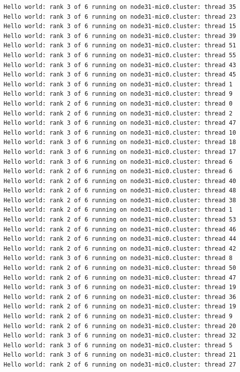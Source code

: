 \documentclass[pscyr,10pt]{hedlab}
\begin{document}
\begin{lstlisting}
  Hello world: rank 3 of 6 running on node31-mic0.cluster: thread 35
  Hello world: rank 3 of 6 running on node31-mic0.cluster: thread 23
  Hello world: rank 3 of 6 running on node31-mic0.cluster: thread 15
  Hello world: rank 3 of 6 running on node31-mic0.cluster: thread 39
  Hello world: rank 3 of 6 running on node31-mic0.cluster: thread 51
  Hello world: rank 3 of 6 running on node31-mic0.cluster: thread 55
  Hello world: rank 3 of 6 running on node31-mic0.cluster: thread 43
  Hello world: rank 3 of 6 running on node31-mic0.cluster: thread 45
  Hello world: rank 3 of 6 running on node31-mic0.cluster: thread 1
  Hello world: rank 3 of 6 running on node31-mic0.cluster: thread 9
  Hello world: rank 2 of 6 running on node31-mic0.cluster: thread 0
  Hello world: rank 2 of 6 running on node31-mic0.cluster: thread 2
  Hello world: rank 3 of 6 running on node31-mic0.cluster: thread 47
  Hello world: rank 3 of 6 running on node31-mic0.cluster: thread 10
  Hello world: rank 3 of 6 running on node31-mic0.cluster: thread 18
  Hello world: rank 3 of 6 running on node31-mic0.cluster: thread 17
  Hello world: rank 3 of 6 running on node31-mic0.cluster: thread 6
  Hello world: rank 2 of 6 running on node31-mic0.cluster: thread 6
  Hello world: rank 2 of 6 running on node31-mic0.cluster: thread 40
  Hello world: rank 2 of 6 running on node31-mic0.cluster: thread 48
  Hello world: rank 2 of 6 running on node31-mic0.cluster: thread 38
  Hello world: rank 2 of 6 running on node31-mic0.cluster: thread 1
  Hello world: rank 2 of 6 running on node31-mic0.cluster: thread 53
  Hello world: rank 2 of 6 running on node31-mic0.cluster: thread 46
  Hello world: rank 2 of 6 running on node31-mic0.cluster: thread 44
  Hello world: rank 2 of 6 running on node31-mic0.cluster: thread 42
  Hello world: rank 3 of 6 running on node31-mic0.cluster: thread 8
  Hello world: rank 2 of 6 running on node31-mic0.cluster: thread 50
  Hello world: rank 2 of 6 running on node31-mic0.cluster: thread 47
  Hello world: rank 3 of 6 running on node31-mic0.cluster: thread 19
  Hello world: rank 2 of 6 running on node31-mic0.cluster: thread 36
  Hello world: rank 2 of 6 running on node31-mic0.cluster: thread 19
  Hello world: rank 2 of 6 running on node31-mic0.cluster: thread 9
  Hello world: rank 2 of 6 running on node31-mic0.cluster: thread 20
  Hello world: rank 3 of 6 running on node31-mic0.cluster: thread 32
  Hello world: rank 3 of 6 running on node31-mic0.cluster: thread 5
  Hello world: rank 3 of 6 running on node31-mic0.cluster: thread 21
  Hello world: rank 2 of 6 running on node31-mic0.cluster: thread 27

\end{lstlisting}
\end{document}
